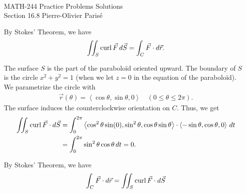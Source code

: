 


	\noindent \hrulefill \\
	MATH-244 \semester \hfill Practice Problems Solutions\\
	Section 16.8 \hfill Pierre-Olivier Paris{\'e} \\\vspace*{-1cm}
	
	\noindent\hrulefill
	
	\spc	

	By Stokes' Theorem, we have
		\begin{align*}
		\iint_S \mathrm{curl}\, \vec{F} \, d\vec{S} = \int_C \vec{F} \cdot d \vec{r} .
		\end{align*}
	
	The surface $S$ is the part of the paraboloïd oriented upward. The boundary of $S$ is the circle $x^2 + y^2 = 1$ (when we let $z = 0$ in the equation of the paraboloïd). We parametrize the circle with
		\begin{align*}
		\vec{r} (\theta ) = \left\langle \cos \theta , \sin \theta , 0 \right\rangle \quad (0 \leq \theta \leq 2 \pi ) .
		\end{align*}
	The surface induces the counterclockwise orientation on $C$. Thus, we get
		\begin{align*}
		\iint_S \mathrm{curl}\, \vec{F} \cdot d \vec{S} &= \int_0^{2\pi} \left\langle \cos^2 \theta \sin (0) , \sin^2 \theta , \cos \theta \sin \theta \right\rangle \cdot \left\langle -\sin \theta , \cos \theta , 0 \right\rangle \, dt \\
		&= \int_0^{2\pi} \sin^2 \theta \cos \theta \, dt = 0 .
		\end{align*}
		
	\spc
	
	By Stokes' Theorem, we have
		\begin{align*}
		\int_C \vec{F} \cdot d \vec{r} = \iint_{S} \mathrm{curl}\, \vec{F} \cdot d \vec{S}
		\end{align*}
	
